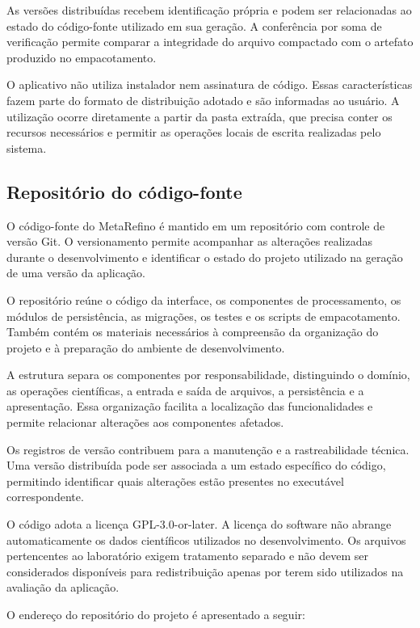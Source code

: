As versões distribuídas recebem identificação própria e podem ser relacionadas ao estado do código-fonte utilizado em sua geração. A conferência por soma de verificação permite comparar a integridade do arquivo compactado com o artefato produzido no empacotamento.

O aplicativo não utiliza instalador nem assinatura de código. Essas características fazem parte do formato de distribuição adotado e são informadas ao usuário. A utilização ocorre diretamente a partir da pasta extraída, que precisa conter os recursos necessários e permitir as operações locais de escrita realizadas pelo sistema.

\subsection{Repositório do código-fonte}
\label{subsec:repositorio-codigo-fonte}

O código-fonte do MetaRefino é mantido em um repositório com controle de versão Git. O versionamento permite acompanhar as alterações realizadas durante o desenvolvimento e identificar o estado do projeto utilizado na geração de uma versão da aplicação.

O repositório reúne o código da interface, os componentes de processamento, os módulos de persistência, as migrações, os testes e os scripts de empacotamento. Também contém os materiais necessários à compreensão da organização do projeto e à preparação do ambiente de desenvolvimento.

A estrutura separa os componentes por responsabilidade, distinguindo o domínio, as operações científicas, a entrada e saída de arquivos, a persistência e a apresentação. Essa organização facilita a localização das funcionalidades e permite relacionar alterações aos componentes afetados.

Os registros de versão contribuem para a manutenção e a rastreabilidade técnica. Uma versão distribuída pode ser associada a um estado específico do código, permitindo identificar quais alterações estão presentes no executável correspondente.

O código adota a licença GPL-3.0-or-later. A licença do software não abrange automaticamente os dados científicos utilizados no desenvolvimento. Os arquivos pertencentes ao laboratório exigem tratamento separado e não devem ser considerados disponíveis para redistribuição apenas por terem sido utilizados na avaliação da aplicação.

O endereço do repositório do projeto é apresentado a seguir:

